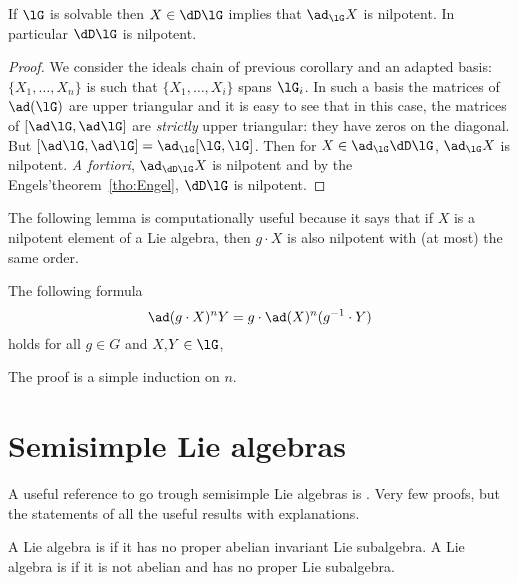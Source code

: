\begin{corollary}
If $\lG$ is solvable then $X\in\dD\lG$ implies that $\ad_{\lG}X$ is nilpotent. In particular $\dD\lG$ is nilpotent.
\end{corollary}

\begin{proof}
We consider the ideals chain of previous corollary and an adapted basis: $\{X_1,\ldots,X_n\}$ is such that $\{X_1,\ldots,X_i\}$ spans $\lG_i$. In such a basis the matrices of $\ad(\lG)$ are upper triangular and it is easy to see that in this case, the matrices of $[\ad\lG,\ad\lG]$ are \emph{strictly} upper triangular: they have zeros on the diagonal. But $[\ad\lG,\ad\lG]=\ad_{\lG}[\lG,\lG]$. Then for $X\in\ad_{\lG}\dD\lG$, $\ad_{\lG}X$ is nilpotent. \emph{A fortiori}, $\ad_{\dD\lG}X$ is nilpotent and by the Engels'theorem~\ref{tho:Engel}, $\dD\lG$ is nilpotent.
\end{proof}

The following lemma is computationally useful because it says that if $X$ is a nilpotent element of a Lie algebra, then $g\cdot X$ is also nilpotent with (at most) the same order.

\begin{lemma}
  The following formula
\begin{equation}
\ad(g\cdot X)^nY=g\cdot \ad(X)^n(g^{-1}\cdot Y)
\end{equation}
holds for all $g\in G$ and $X$,$Y\in\lG$,
\label{lem:nil_Ad}
\end{lemma}

The proof is a simple induction on $n$.

\section{Semisimple Lie algebras}

A useful reference to go trough semisimple Lie algebras is \cite{Wisser}. Very few proofs, but the statements of all the useful results with explanations.

\begin{definition}
    A Lie algebra is  if it has no proper abelian invariant Lie subalgebra. A Lie algebra is  if it is not abelian and has no proper Lie subalgebra.
\end{definition}

